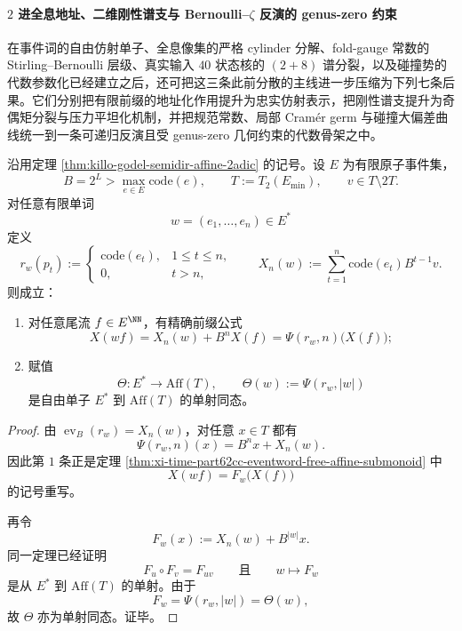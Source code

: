 \paragraph{\texorpdfstring{$2$}{2} 进全息地址、二维刚性谱支与 Bernoulli--\texorpdfstring{$\zeta$}{zeta} 反演的 genus-zero 约束}
在事件词的自由仿射单子、全息像集的严格 cylinder 分解、fold-gauge 常数的 Stirling--Bernoulli 层级、真实输入 \(40\) 状态核的 \((2+8)\) 谱分裂，以及碰撞势的代数参数化已经建立之后，还可把这三条此前分散的主线进一步压缩为下列七条后果。它们分别把有限前缀的地址化作用提升为忠实仿射表示，把刚性谱支提升为奇偶矩分裂与压力平坦化机制，并把规范常数、局部 Cram\'er germ 与碰撞大偏差曲线统一到一条可递归反演且受 genus-zero 几何约束的代数骨架之中。

\begin{theorem}\label{thm:xi-time-part9xb-prefix-words-faithful-affine-realization}
沿用定理 \ref{thm:killo-godel-semidir-affine-2adic} 的记号。设 \(E\) 为有限原子事件集，
\[
B=2^L>\max_{e\in E}\mathrm{code}(e),
\qquad
T:=T_2(E_{\min}),
\qquad
v\in T\setminus 2T.
\]
对任意有限单词
\[
w=(e_1,\dots,e_n)\in E^\ast
\]
定义
\[
r_w(p_t):=
\begin{cases}
\mathrm{code}(e_t),&1\le t\le n,\\
0,&t>n,
\end{cases}
\qquad
X_n(w):=\sum_{t=1}^{n}\mathrm{code}(e_t)B^{t-1}v.
\]
则成立：
\begin{enumerate}
  \item 对任意尾流 \(f\in E^{\NN}\)，有精确前缀公式
  \[
  X(wf)=X_n(w)+B^nX(f)=\Psi(r_w,n)\bigl(X(f)\bigr);
  \]
  \item 赋值
  \[
  \Theta:E^\ast\longrightarrow \mathrm{Aff}(T),
  \qquad
  \Theta(w):=\Psi(r_w,|w|)
  \]
  是自由单子 \(E^\ast\) 到 \(\mathrm{Aff}(T)\) 的单射同态。
\end{enumerate}
\end{theorem}
\begin{proof}
由 \(\operatorname{ev}_B(r_w)=X_n(w)\)，对任意 \(x\in T\) 都有
\[
\Psi(r_w,n)(x)=B^n x+X_n(w).
\]
因此第 \(1\) 条正是定理
\ref{thm:xi-time-part62cc-eventword-free-affine-submonoid} 中
\[
X(wf)=F_w\bigl(X(f)\bigr)
\]
的记号重写。

再令
\[
F_w(x):=X_n(w)+B^{|w|}x.
\]
同一定理已经证明
\[
F_u\circ F_v=F_{uv}
\qquad\text{且}\qquad
w\longmapsto F_w
\]
是从 \(E^\ast\) 到 \(\mathrm{Aff}(T)\) 的单射。由于
\[
F_w=\Psi(r_w,|w|)=\Theta(w),
\]
故 \(\Theta\) 亦为单射同态。证毕。
\end{proof}

